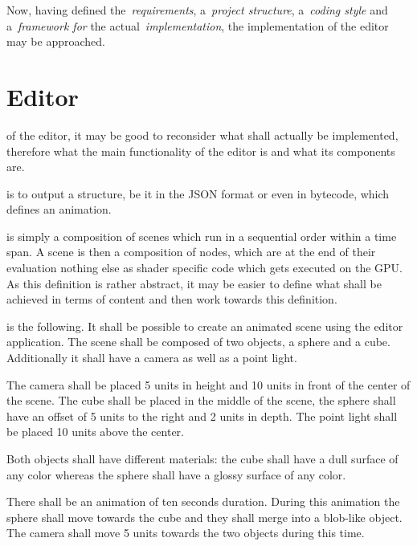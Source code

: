 \documentclass[%
    a4paper,    %
    justified,  %
    nobib,      %
    openany     %
]{tufte-book}
\begin{document}
Now, having defined the~\emph{requirements}, a~\emph{project structure},
a~\emph{coding style} and a~\emph{framework for} the
actual~\emph{implementation}, the implementation of the editor may be
approached.

\chapter{Editor}
\label{appendix:chap:editor}

 of the editor, it may
be good to reconsider what shall actually be implemented, therefore what the
main functionality of the editor is and what its components are.

 is to output a structure, be it in
the JSON format or even in bytecode, which defines an animation.

 is simply a composition of scenes which run in a
sequential order within a time span. A scene is then a composition of nodes,
which are at the end of their evaluation nothing else as shader specific code
which gets executed on the GPU. As this definition is rather abstract, it may be
easier to define what shall be achieved in terms of content and then work
towards this definition.

 is the following.
It shall be possible to create an animated scene using the editor application.
The scene shall be composed of two objects, a sphere and a cube. Additionally it
shall have a camera as well as a point light.

The camera shall be placed 5 units in height and 10 units in front of the center
of the scene. The cube shall be placed in the middle of the scene, the sphere
shall have an offset of 5 units to the right and 2 units in depth. The point
light shall be placed 10 units above the center.

Both objects shall have different materials: the cube shall have a dull surface
of any color whereas the sphere shall have a glossy surface of any color.

There shall be an animation of ten seconds duration. During this animation the
sphere shall move towards the cube and they shall merge into a blob-like object.
The camera shall move 5 units towards the two objects during this time.

\end{document}
